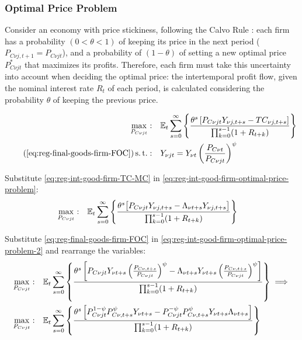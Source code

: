\documentclass[
thesis.tex
]{subfiles}
\begin{document}
\subsubsection*{Optimal Price Problem}

Consider an economy with price stickiness, following the Calvo Rule \cite{calvo_staggered_1983}: each firm has a probability $(0 < \theta < 1)$ of keeping its price in the next period ($P_{C\nu j,t+1} = P_{C\nu jt}$), and a probability of $(1 - \theta)$ of setting a new optimal price $P_{C\nu jt}^\ast$ that maximizes its profits. Therefore, each firm must take this uncertainty into account when deciding the optimal price: the intertemporal profit flow, given the nominal interest rate $R_t$ of each period, is calculated considering the probability $\theta$ of keeping the previous price.

\begin{align}
	\label{eq:reg-int-good-firm-optimal-price-problem}
	\max_{P_{C\nu jt}}: & \quad \E \sum_{s=0}^{\infty} \left\{ \frac{ \theta^s \left[ P_{C\nu jt} Y_{\nu j,t+s} - TC_{\nu j,t+s} \right] }{\prod_{k=0}^{s-1}(1+R_{t+k})} \right\} \\
	\tag{\ref{eq:reg-final-goods-firm-FOC}}
	\st: & \quad Y_{\nu jt} = Y_{\nu t} \left( \frac{P_{C\nu t}}{P_{C\nu jt}} \right)^{\psi}
\end{align}


Substitute \ref{eq:reg-int-good-firm-TC-MC} in \ref{eq:reg-int-good-firm-optimal-price-problem}:
\begin{align}
	\label{eq:reg-int-good-firm-optimal-price-problem-2}
	\max_{P_{C\nu jt}}: & \quad {\mathbb{E}_{t}} \sum_{s=0}^{\infty} \left\{ \frac{\theta^s \big[ P_{C\nu jt} Y_{\nu j,t+s} - \Lambda_{\nu t+s} Y_{\nu j,t+s} \big]}{\prod_{k=0}^{s-1}(1+R_{t+k})} \right\}
\end{align}

Substitute \ref{eq:reg-final-goods-firm-FOC} in \ref{eq:reg-int-good-firm-optimal-price-problem-2} and rearrange the variables:
\begin{align}
	\max_{P_{C\nu jt}}: & \quad {\mathbb{E}_{t}} \sum_{s=0}^{\infty} \left\{ \frac{\theta^s \left[ P_{C\nu jt} Y_{\nu t+s} \left( \frac{P_{C\nu, t+s}}{P_{C\nu jt}} \right)^{\psi} - \Lambda_{\nu t+s} Y_{\nu t+s} \left( \frac{P_{C\nu, t+s}}{P_{C\nu jt}} \right)^{\psi} \right] }{\prod_{k=0}^{s-1}(1+R_{t+k})} \right\} \implies \nonumber 
	\\
	\max_{P_{C\nu jt}}: & \quad {\mathbb{E}_{t}} \sum_{s=0}^{\infty} \left\{ \frac{\theta^s \left[ P_{C\nu jt}^{1-\psi} P_{C\nu, t+s}^{\psi} Y_{\nu t+s} - P_{C\nu jt}^{-\psi} P_{C\nu, t+s}^{\psi} Y_{\nu t+s} \Lambda_{\nu t+s} \right] }{\prod_{k=0}^{s-1}(1+R_{t+k})} \right\} \nonumber
\end{align}
\end{document}
